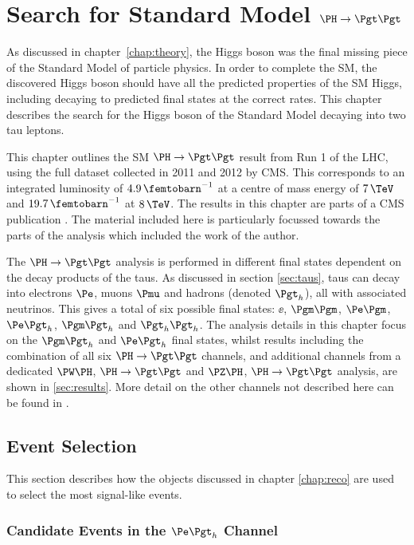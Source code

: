 \chapter{Search for Standard Model $\PH \to \Pgt\Pgt$}
\label{chap:htt-sm}

As discussed in chapter~\ref{chap:theory}, the Higgs boson was the final missing 
piece of the Standard Model of particle physics. In order to complete the
\ac{SM}, the discovered Higgs boson should have all the predicted properties of the
\ac{SM} Higgs, including decaying to predicted final states at the correct rates. This
chapter describes the search for the Higgs boson of the Standard Model 
decaying into two tau leptons.

This chapter outlines the \ac{SM} $\HToTauTau$ result from Run 1 of the \ac{LHC}, using the
full dataset collected in 2011 and 2012 by CMS. This corresponds to an
integrated luminosity of $4.9\,\femtobarn^{-1}$ at a centre of mass energy of $7\,\TeV$ and
$19.7\,\femtobarn^{-1}$ at $8\,\TeV$. The results in this chapter are parts of a CMS publication 
\cite{HIG-13-004}. The material included 
here is particularly focussed towards the parts of the analysis which 
included the work of the author. 

The $\HToTauTau$ analysis is performed in different final states dependent
on the decay products of the taus. As discussed in section
\ref{sec:taus}, taus can decay into electrons $\Pe$,
muons $\Pmu$ and hadrons (denoted $\Pgth$), all with associated neutrinos.
This gives a total of six possible final states: $\ee$, $\mumu$, $\emu$,
$\etau$, $\mutau$ and $\tautau$. The analysis details in this chapter focus on
the $\mutau$ and $\etau$ final states, whilst results including the combination of all
six $\HToTauTau$ channels, and additional channels from a dedicated $\PW\PH$, $\PH\to\Pgt\Pgt$ and
$\PZ\PH$, $\PH\to\Pgt\Pgt$ analysis, are shown in \ref{sec:results}. More detail on the other channels
not described here can be found in \cite{HIG-13-004}. 

\section{Event Selection}
\label{sec:eventSelection}

This section describes how the objects discussed in chapter
\ref{chap:reco} are used to select the most signal-like events. 

\subsection{Candidate Events in the $\etau$ Channel}

